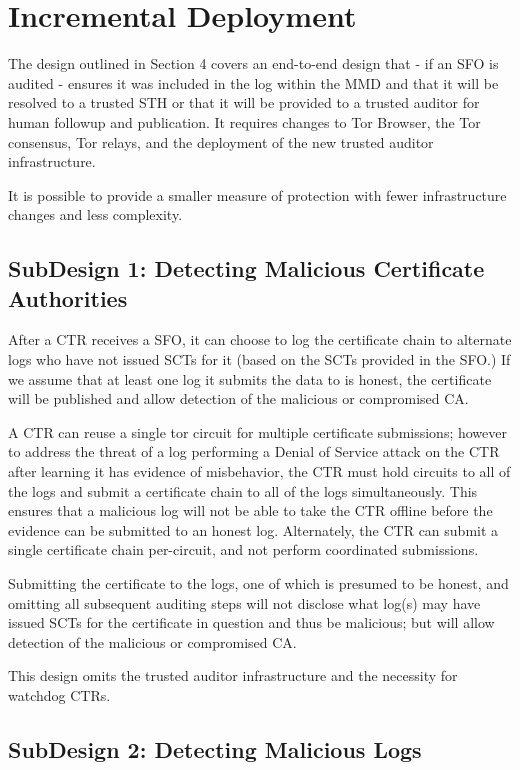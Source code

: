 \section{Incremental Deployment} \label{sec:incremental}

The design outlined in Section 4 covers an end-to-end design that - if an SFO
is audited - ensures it was included in the log within the MMD and that it will be
resolved to a trusted STH or that it will be provided to a trusted auditor for
human followup and publication. It requires changes to Tor Browser, the Tor
consensus, Tor relays, and the deployment of the new trusted auditor
infrastructure.

It is possible to provide a smaller measure of protection with fewer infrastructure
changes and less complexity.

\subsection{SubDesign 1: Detecting Malicious Certificate Authorities}

After a CTR receives a SFO, it can choose to log the certificate chain to alternate
logs who have not issued SCTs for it (based on the SCTs provided in the SFO.) If
we assume that at least one log it submits the data to is honest, the certificate will
be published and allow detection of the malicious or compromised CA.

A CTR can reuse a single tor circuit for multiple certificate submissions; however
to address the threat of a log performing a Denial of Service attack on the CTR
after learning it has evidence of misbehavior, the CTR must hold circuits to all of
the logs and submit a certificate chain to all of the logs simultaneously. This
ensures that a malicious log will not be able to take the CTR offline before the
evidence can be submitted to an honest log. Alternately, the CTR can submit a single
certificate chain per-circuit, and not perform coordinated submissions.

Submitting the certificate to the logs, one of which is presumed to be honest, and
omitting all subsequent auditing steps will not disclose what log(s) may have issued
SCTs for the certificate in question and thus be malicious; but will allow detection
of the malicious or compromised CA.

This design omits the trusted auditor infrastructure and the necessity for watchdog
CTRs.

\subsection{SubDesign 2: Detecting Malicious Logs}

